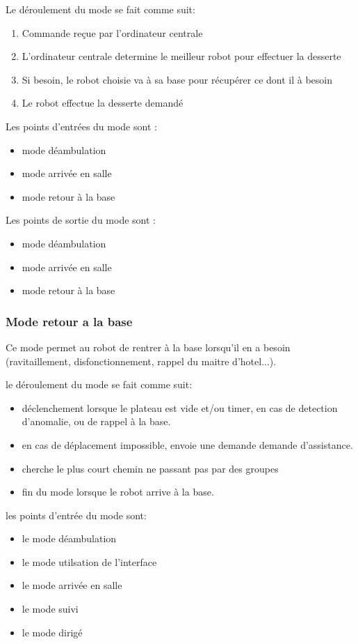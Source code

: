 Le déroulement du mode se fait comme suit:
\begin{enumerate}
\item Commande reçue par l'ordinateur centrale
\item L'ordinateur centrale determine le meilleur robot pour effectuer la desserte
\item Si besoin, le robot choisie va à sa base pour récupérer ce dont il à besoin
\item Le robot effectue la desserte demandé\\
\end{enumerate}


Les points d'entrées du mode sont :
\begin{itemize}
\item mode déambulation
\item mode arrivée en salle
\item mode retour à la base
\end{itemize}

Les points de sortie du mode sont :
\begin{itemize}
\item mode déambulation
\item mode arrivée en salle
\item mode retour à la base
\end{itemize}

\subsubsection{Mode retour a la base}

Ce mode permet au robot de rentrer à la base lorsqu'il en a besoin
(ravitaillement, disfonctionnement, rappel du maitre d'hotel...).

le déroulement du mode se fait comme suit:
\begin{itemize}
\item déclenchement lorsque le plateau est vide et/ou timer, en cas de
  detection d'anomalie, ou de rappel à la base.
\item en cas de déplacement impossible, envoie une demande demande
  d'assistance.
\item cherche le plus court chemin ne passant pas par des groupes
\item fin du mode lorsque le robot arrive à la base.\\
\end{itemize}

les points d'entrée du mode sont:
\begin{itemize}
\item le mode déambulation
\item le mode utilsation de l'interface
\item le mode arrivée en salle
\item le mode suivi
\item le mode dirigé\\
\end{itemize}

